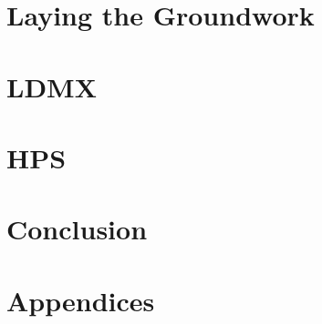 \documentclass[11pt, oneside]{mnthesis}
\begin{document}



\part{Laying the Groundwork}



\part{LDMX} \label{part:ldmx}




\part{HPS} \label{part:hps}







\part{Conclusion} \label{part:conclusion}




\part{Appendices}
\appendix
\todos

\end{document}
